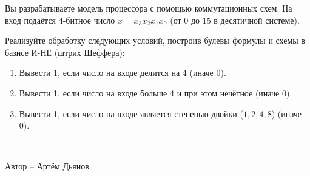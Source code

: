 \question
Вы разрабатываете модель процессора с помощью коммутационных схем. На вход подаётся 4-битное число $x=x_3x_2x_1x_0$ (от 0 до 15 в десятичной системе).

Реализуйте обработку следующих условий, построив булевы формулы и схемы в базисе И-НЕ (штрих Шеффера):
\begin{enumerate}
\item Вывести 1, если число на входе делится на 4 (иначе 0).
\item Вывести 1, если число на входе больше 4 и при этом нечётное (иначе 0).
\item Вывести 1, если число на входе является степенью двойки ($1,2,4,8$) (иначе 0).
\end{enumerate}

---------------

Автор -- Артём Дьянов
